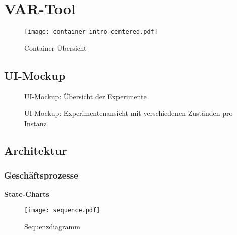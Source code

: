 \chapter{VAR-Tool}
\label{ch:main-matter}
  \begin{figure}[H]
    \centering
    \texttt{[image: container\_intro\_centered.pdf]}
    \par
    \caption{Container-Übersicht}
    \label{fig:container-intro}
  \end{figure}
  \clearpage


\section{UI-Mockup}
\begin{landscape}
  \begin{figure}[h]
    \centering
    \par
    \caption{UI-Mockup: Übersicht der Experimente}
    \label{fig:ui-mockup-1}
  \end{figure}
  \begin{figure}[h]
    \centering
    \par
    \caption{UI-Mockup: Experimentenansicht mit verschiedenen Zuständen pro Instanz}
    \label{fig:ui-mockup-2}
  \end{figure}
\end{landscape}

\section{Architektur}

\subsection{Geschäftsprozesse}
{\bfseries State-Charts}
\begin{landscape}
  \begin{figure}[h]
    \centering
    \texttt{[image: sequence.pdf]}
    \par
    \caption{Sequenzdiagramm}
    \label{fig:sequence}
  \end{figure}
\end{landscape}

